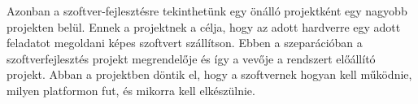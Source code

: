 \documentclass[a4paper,12pt,leqno, notitlepage]{article}%
\begin{document}
Azonban a szoftver-fejlesztésre tekinthetünk egy önálló projektként egy nagyobb projekten belül. Ennek a projektnek a célja, hogy az adott hardverre egy adott feladatot megoldani képes szoftvert szállítson. Ebben a szeparációban a szoftverfejlesztés projekt megrendelője és így a vevője a rendszert előállító projekt. Abban a projektben döntik el, hogy a szoftvernek hogyan kell működnie, milyen platformon fut, és mikorra kell elkészülnie. 

{}

\end{document}

